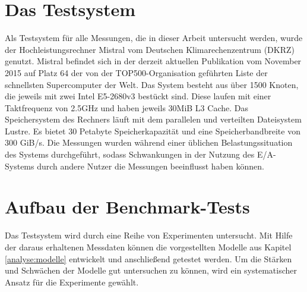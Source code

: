\documentclass[
	12pt,
	a4paper,
	BCOR10mm,
	DIV14,
	listof=totoc,
	bibliography=totoc,
	headsepline
]{scrreprt}
\begin{document}
\section{Das Testsystem}
\label{eval:testsystem}
Als Testsystem für alle Messungen, die in dieser Arbeit untersucht werden, wurde der Hochleistungsrechner Mistral vom Deutschen Klimarechenzentrum (DKRZ) genutzt.
Mistral befindet sich in der derzeit aktuellen Publikation vom November 2015 auf Platz 64 der von der TOP500-Organisation geführten Liste der schnellsten Supercomputer der Welt.
Das System besteht aus über 1500 Knoten, die jeweils mit zwei Intel E5-2680v3 bestückt sind. Diese laufen mit einer Taktfrequenz von 2.5GHz und haben jeweils 30MiB L3 Cache.
Das Speichersystem des Rechners läuft mit dem parallelen und verteilten Dateisystem Lustre.
Es bietet 30 Petabyte Speicherkapazität und eine Speicherbandbreite von 300 GiB/s. Die Messungen wurden während einer üblichen Belastungssituation des Systems durchgeführt, sodass Schwankungen in der Nutzung des E/A-Systems durch andere Nutzer die Messungen beeinflusst haben können.

\section{Aufbau der Benchmark-Tests}
\label{eval:benchmark}
Das Testsystem wird durch eine Reihe von Experimenten untersucht.
Mit Hilfe der daraus erhaltenen Messdaten können die vorgestellten Modelle aus Kapitel \ref{analyse:modelle} entwickelt und anschließend getestet werden.
Um die Stärken und Schwächen der Modelle gut untersuchen zu können, wird ein systematischer Ansatz für die Experimente gewählt.\medskip
\end{document}
